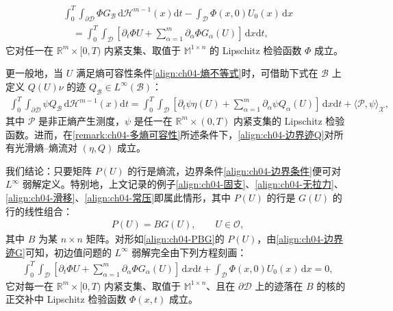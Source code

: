 \documentclass[../../main.tex]{subfiles}
\begin{document}
\begin{align}
\int_{0}^{T}\int_{\partial\mathscr{D}}\Phi G_{\mathscr{B}}\,\mathrm{d}\mathscr{H}^{m-1}(x)\mathrm{d}t-\int_{\mathscr{D}}\Phi(x,0)U_{0}(x)\,\mathrm{d}x\nonumber\\
\quad=\int_{0}^{T}\int_{\mathscr{D}}\left[\partial_{t}\Phi U+\sum_{\alpha=1}^{m}\partial_{\alpha}\Phi G_{\alpha}(U)\right]\,\mathrm{d}x\mathrm{d}t,
\label{align:ch04-边界迹G}
\end{align}
它对任一在 $\mathbb{R}^{m}\times[0,T)$ 内紧支集、取值于 $\mathbb{M}^{1\times n}$ 的 Lipschitz 检验函数 $\Phi$ 成立。

更一般地，当 $U$ 满足熵可容性条件\eqref{align:ch04-熵不等式}时，可借助下式在 $\mathscr{B}$ 上定义 $Q(U)\nu$ 的迹 $Q_{\mathscr{B}}\in L^{\infty}(\mathscr{B})$：
\begin{align}
\int_{0}^{T}\int_{\partial\mathscr{D}}\psi Q_{\mathscr{B}}\,\mathrm{d}\mathscr{H}^{m-1}(x)\mathrm{d}t=\int_{0}^{T}\int_{\mathscr{D}}\left[\partial_{t}\psi\eta(U)+\sum_{\alpha=1}^{m}\partial_{\alpha}\psi Q_{\alpha}(U)\right]\,\mathrm{d}x\mathrm{d}t+\langle\mathscr{P},\psi\rangle_{\mathscr{X}},
\label{align:ch04-边界迹Q}
\end{align}
其中 $\mathscr{P}$ 是非正熵产生测度，$\psi$ 是任一在 $\mathbb{R}^{m}\times(0,T)$ 内紧支集的 Lipschitz 检验函数。进而，在\cref{remark:ch04-多熵可容性}所述条件下，\eqref{align:ch04-边界迹Q}对所有光滑熵--熵流对 $(\eta,Q)$ 成立。

我们结论：只要矩阵 $P(U)$ 的行是熵流，边界条件\eqref{align:ch04-边界条件}便可对 $L^{\infty}$ 弱解定义。特别地，上文记录的例子\eqref{align:ch04-固支}、\eqref{align:ch04-无拉力}、\eqref{align:ch04-滑移}、\eqref{align:ch04-常压}即属此情形，其中 $P(U)$ 的行是 $G(U)$ 的行的线性组合：
\begin{align}
P(U)=BG(U),\qquad U\in\mathcal{O},
\label{align:ch04-PBG}
\end{align}
其中 $B$ 为某 $n\times n$ 矩阵。对形如\eqref{align:ch04-PBG}的 $P(U)$，由\eqref{align:ch04-边界迹G}可知，初边值问题的 $L^{\infty}$ 弱解完全由下列方程刻画：
\begin{align}
\int_{0}^{T}\int_{\mathscr{D}}\left[\partial_{t}\Phi U+\sum_{\alpha=1}^{m}\partial_{\alpha}\Phi G_{\alpha}(U)\right]\,\mathrm{d}x\mathrm{d}t+\int_{\mathscr{D}}\Phi(x,0)U_{0}(x)\,\mathrm{d}x=0,
\label{align:ch04-初边弱形式}
\end{align}
它对每一在 $\mathbb{R}^{m}\times[0,T)$ 内紧支集、取值于 $\mathbb{M}^{1\times n}$、且在 $\partial\mathscr{D}$ 上的迹落在 $B$ 的核的正交补中 Lipschitz 检验函数 $\Phi(x,t)$ 成立。
\end{document}
